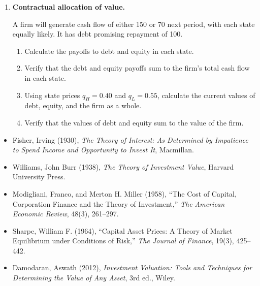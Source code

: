 \begin{enumerate}
\begin{enumerate}
\item Explain why equal expected payoffs need not imply equal values at date 0.

\end{enumerate}


\item \textbf{Contractual allocation of value.}

A firm will generate cash flow of either 150 or 70 next period, with each state equally likely. It has debt promising repayment of 100.

\begin{enumerate}

\item Calculate the payoffs to debt and equity in each state.

\item Verify that the debt and equity payoffs sum to the firm's total cash flow in each state.

\item Using state prices $q_H=0.40$ and $q_L=0.55$, calculate the current values of debt, equity, and the firm as a whole.

\item Verify that the values of debt and equity sum to the value of the firm.

\end{enumerate}

\end{enumerate}



\begin{itemize}

\item Fisher, Irving (1930), 
\emph{The Theory of Interest: As Determined by Impatience to Spend Income and Opportunity to Invest It}, 
Macmillan.

\item Williams, John Burr (1938), 
\emph{The Theory of Investment Value}, 
Harvard University Press.

\item Modigliani, Franco, and Merton H. Miller (1958), 
``The Cost of Capital, Corporation Finance and the Theory of Investment,'' 
\emph{The American Economic Review}, 48(3), 261--297.

\item Sharpe, William F. (1964), 
``Capital Asset Prices: A Theory of Market Equilibrium under Conditions of Risk,'' 
\emph{The Journal of Finance}, 19(3), 425--442.

\item Damodaran, Aswath (2012), 
\emph{Investment Valuation: Tools and Techniques for Determining the Value of Any Asset}, 
3rd ed., Wiley.

\end{itemize}

